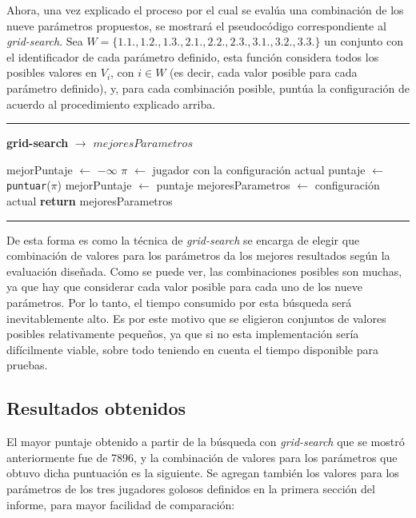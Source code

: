 \documentclass[12pt,a4paper]{article}
\makeatletter
\newenvironment{breakablealgorithm}
  {%
   \begin{flushleft}
     \refstepcounter{algorithm}%
     \hrule height.8pt depth0pt \kern2pt%
     \renewcommand{\caption}[2][\relax]{%
       {\raggedright\textbf{\ALG@name~\thealgorithm} ##2\par}%
       \ifx\relax##1\relax %
         \addcontentsline{loa}{algorithm}{\protect\numberline{\thealgorithm}##2}%
       \else %
         \addcontentsline{loa}{algorithm}{\protect\numberline{\thealgorithm}##1}%
       \fi
       \kern2pt\hrule\kern2pt
     }
  }{%
     \kern2pt\hrule\relax%
   \end{flushleft}
  }
\makeatother
\begin{document}
    Ahora, una vez explicado el proceso por el cual se evalúa una combinación de los nueve parámetros propuestos, se mostrará el pseudocódigo correspondiente al \textit{grid-search}. Sea $W = \{1.1., 1.2., 1.3., 2.1., 2.2., 2.3., 3.1., 3.2., 3.3. \}$ un conjunto con el identificador de cada parámetro definido, esta función considera todos los posibles valores en $V_{i}$, con $i \in W$ (es decir, cada valor posible para cada parámetro definido), y, para cada combinación posible, puntúa la configuración de acuerdo al procedimiento explicado arriba.
    
    \begin{breakablealgorithm}{\textbf{grid-search} $\to$ $mejoresParametros$}
    \begin{algorithmic}[1]
        
        \State mejorPuntaje $\gets$ $ - \infty$
            \State $\pi$ $\gets$ jugador con la configuración actual
            \State puntaje $\gets$ \texttt{puntuar}($\pi$)
                \State mejorPuntaje $\gets$ puntaje
                \State mejoresParametros $\gets$ configuración actual
            \EndIf
        \EndFor
        \State \textbf{return} mejoresParametros
        
    \end{algorithmic}
    \end{breakablealgorithm}
    
    De esta forma es como la técnica de \textit{grid-search} se encarga de elegir que combinación de valores para los parámetros da los mejores resultados según la evaluación diseñada. Como se puede ver, las combinaciones posibles son muchas, ya que hay que considerar cada valor posible para cada uno de los nueve parámetros. Por lo tanto, el tiempo consumido por esta búsqueda será inevitablemente alto. Es por este motivo que se eligieron conjuntos de valores posibles relativamente pequeños, ya que si no esta implementación sería difícilmente viable, sobre todo teniendo en cuenta el tiempo disponible para pruebas.
    
    
    
    \subsection{Resultados obtenidos}
    
    El mayor puntaje obtenido a partir de la búsqueda con \textit{grid-search} que se mostró anteriormente fue de 7896, y la combinación de valores para los parámetros que obtuvo dicha puntuación es la siguiente. Se agregan también los valores para los parámetros de los tres jugadores golosos definidos en la primera sección del informe, para mayor facilidad de comparación:
    
\end{document}
